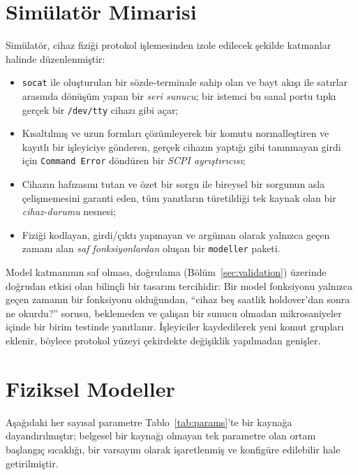 \documentclass[9pt,twocolumn,a4paper]{extarticle}
\begin{document}
\section{Simülatör Mimarisi}
\label{sec:arch}
Simülatör, cihaz fiziği protokol işlemesinden izole edilecek şekilde katmanlar halinde düzenlenmiştir:
\begin{itemize}
\item \texttt{socat} ile oluşturulan bir sözde-terminale sahip olan ve bayt akışı ile satırlar arasında dönüşüm yapan bir \emph{seri sunucu}; bir istemci bu sanal portu tıpkı gerçek bir \texttt{/dev/tty} cihazı gibi açar;
\item Kısaltılmış ve uzun formları çözümleyerek bir komutu normalleştiren ve kayıtlı bir işleyiciye gönderen, gerçek cihazın yaptığı gibi tanınmayan girdi için \texttt{Command Error} döndüren bir \emph{SCPI ayrıştırıcısı};
\item Cihazın hafızasını tutan ve özet bir sorgu ile bireysel bir sorgunun asla çelişmemesini garanti eden, tüm yanıtların türetildiği tek kaynak olan bir \emph{cihaz-durumu} nesnesi;
\item Fiziği kodlayan, girdi/çıktı yapmayan ve argüman olarak yalnızca geçen zamanı alan \emph{saf fonksiyonlardan} oluşan bir \texttt{modeller} paketi.
\end{itemize}
Model katmanının saf olması, doğrulama (Bölüm~\ref{sec:validation}) üzerinde doğrudan etkisi olan bilinçli bir tasarım tercihidir: Bir model fonksiyonu yalnızca geçen zamanın bir fonksiyonu olduğundan, ``cihaz beş saatlik holdover'dan sonra ne okurdu?'' sorusu, beklemeden ve çalışan bir sunucu olmadan mikrosaniyeler içinde bir birim testinde yanıtlanır. İşleyiciler kaydedilerek yeni komut grupları eklenir, böylece protokol yüzeyi çekirdekte değişiklik yapılmadan genişler.

\section{Fiziksel Modeller}
\label{sec:models}
Aşağıdaki her sayısal parametre Tablo~\ref{tab:params}'te bir kaynağa dayandırılmıştır; belgesel bir kaynağı olmayan tek parametre olan ortam başlangıç sıcaklığı, bir varsayım olarak işaretlenmiş ve konfigüre edilebilir hale getirilmiştir.
\end{document}
